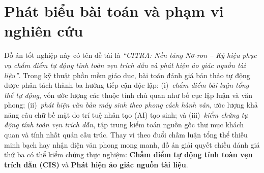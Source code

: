 \section{Phát biểu bài toán và phạm vi nghiên cứu}

Đồ án tốt nghiệp này có tên đề tài là \textit{``CITRA: Nền tảng Nơ-ron -- Ký hiệu phục vụ chấm điểm tự động tính toàn vẹn trích dẫn và phát hiện ảo giác nguồn tài liệu''}. Trong kỹ thuật phần mềm giáo dục, bài toán đánh giá bản thảo tự động được phân tách thành ba hướng tiếp cận độc lập: (i)~\emph{chấm điểm bài luận tổng thể tự động}, vốn ước lượng các thuộc tính chủ quan như bố cục lập luận và văn phong; (ii)~\emph{phát hiện văn bản máy sinh theo phong cách hành văn}, ước lượng khả năng câu chữ bề mặt do trí tuệ nhân tạo (AI) tạo sinh; và (iii)~\emph{kiểm chứng tự động tính toàn vẹn trích dẫn}, tập trung kiểm toán nguồn gốc thư mục khách quan và tính nhất quán cấu trúc. Thay vì theo đuổi chấm luận tổng thể thiếu minh bạch hay nhận diện văn phong mong manh, đồ án giải quyết chiều đánh giá thứ ba có thể kiểm chứng thực nghiệm: \textbf{Chấm điểm tự động tính toàn vẹn trích dẫn (CIS)} và \textbf{Phát hiện ảo giác nguồn tài liệu}.

